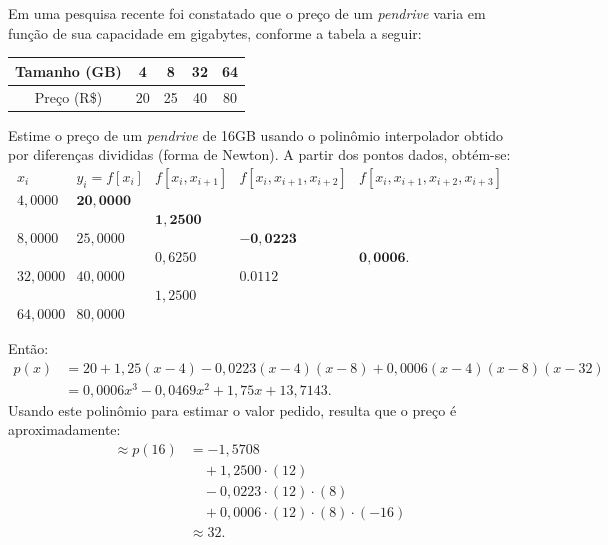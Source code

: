 \documentclass[12pt,a4paper]{article}
\begin{document}
\begin{ExerciseList}
\Exercise[title={2,0}]
Em uma pesquisa recente foi constatado que o preço de um \textit{pendrive} varia em função de sua capacidade em gigabytes, conforme a tabela a seguir:
\medskip
\begin{center}
\begin{tabular}{|c|c|c|c|c|}
\hline
Tamanho (GB) & 4 & 8 & 32 & 64 \\
\hline
Preço (R\$) & 20 & 25 & 40 & 80 \\
\hline
\end{tabular}
\end{center}\medskip
Estime o preço de um \textit{pendrive} de 16GB usando o polinômio interpolador obtido por diferenças divididas (forma de Newton).
\Answer A partir dos pontos dados, obtém-se:
\[
	\begin{array}{cccccc}
   x_i & y_i=f[x_i] & f[x_i,x_{i+1}] & f[x_i,x_{i+1},x_{i+2}]  & f[x_i,x_{i+1},x_{i+2},x_{i+3}] \\
   4,0000 & \mathbf{20,0000} \\
	    &            & \mathbf{1,2500} \\
   8,0000 & 25,0000 &             & \mathbf{-0,0223}\\
	    &            & 0,6250 &              & \mathbf{0,0006}. \\
  32,0000 & 40,0000 &             & 0.0112\\
	    &            & 1,2500 \\
  64,0000 & 80,0000
	\end{array}
\]

Então:
\begin{align*}
p(x)
&=20
 +1,25(x-4)
 -0,0223(x-4)(x-8)
 +0,0006(x-4)(x-8)(x-32)\\
& = 0,0006x^3 - 0,0469x^2 + 1,75x + 13,7143.
\end{align*}
Usando este polinômio para estimar o valor pedido, resulta que o preço é aproximadamente:
\begin{align*}
\approx p(16)
& =-1,5708\\
& \quad +1,2500\cdot(12)\\
& \quad -0,0223\cdot(12)\cdot(8)\\
& \quad +0,0006\cdot(12)\cdot(8)\cdot(-16)\\
& \approx 32.
\end{align*}


\end{ExerciseList}
\end{document}
